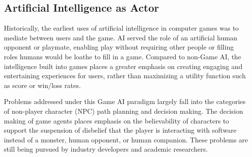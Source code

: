 \documentclass[conference]{IEEEtran}
\newcommand{\mytodo}[1]{\textbf{[[#1]]}}
\begin{document}
\subsection{Artificial Intelligence as Actor}

%
%
Historically, the earliest uses of artificial intelligence in computer games was to mediate between users and the game.
AI served the role of an artificial human opponent or playmate, enabling play without requiring other people or filling roles humans would be loathe to fill in a game.
%
Compared to non-Game AI, the intelligence built into games places a greater emphasis on creating engaging and entertaining experiences for users, 
rather than maximizing a utility function such as score or win/loss rates. 

Problems addressed under this Game AI paradigm largely fall into the categories of non-player character (NPC) path planning and decision making.
The decision making of game agents places emphasis on the believability of characters to support the suspension of disbelief that the player is interacting with software instead of a monster, human opponent, or human companion.
These problems are still being pursued by industry developers and academic researchers.
\end{document}

